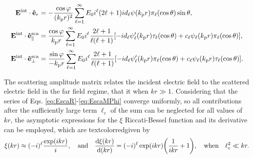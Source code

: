 \begin{subequations}\label{eq:Eint}%
\begin{align}
\vb{E}^\text{int}\cdot\vu{e}_r &=  -\frac{\cos\varphi}{(k_\text{p}r)^2}
               \sum_{\ell = 1}^\infty E_0i^\ell(2\ell+1)
               id_\ell \psi(k_\text{p}r)\pi_\ell(\cos\theta) \sin\theta ,
\label{eq:EintR}\\
\vb{E}^\text{int}\cdot\vu{e}^\text{sca}_\parallel &=  \frac{\cos\varphi}{k_\text{p}r}
               \sum_{\ell = 1}^\infty E_0i^\ell\frac{2\ell+1}{\ell(\ell+1)}
           [-i d_\ell\psi_\ell'(k_\text{p}r)\tau_\ell(\cos\theta)+c_\ell\psi_\ell(k_\text{p}r)\pi_\ell(\cos\theta)],
\label{eq:EintTheta}\\
\vb{E}^\text{int}\cdot\vu{e}^\text{sca}_\perp &=  \frac{\sin\varphi}{-k_\text{p}r}
               \sum_{\ell = 1}^\infty E_0i^\ell\frac{2\ell+1}{\ell(\ell+1)}
           [-i d_\ell\psi_\ell'(k_\text{p}r)\pi_\ell(\cos\theta)+c_\ell\psi_\ell(k_\text{p}r)\tau_\ell(\cos\theta)].
\label{eq:EintMPhi}
\end{align}%
\end{subequations}


The scattering amplitude matrix relates the incident electric field to the scattered electric field in the far field regime, that it when $kr\gg 1$. Considering that the series of Eqs. \eqref{eq:EscaR}-\eqref{eq:EscaMPhi} converge uniformly, so all contributions after the sufficiently large  term $\ell_c$ of the sum can be neglected for all values of $kr$, the asymptotic  expressions for the $\xi$ Riccati-Bessel function and its derivative can be employed, which are textcolor{red}{given by} \cite{bohren_absorption_1983}
%
%
%
\begin{align}
\xi(kr)\approx (-i)^\ell \frac{\exp(ikr)}{i},
\qqtext{and}
\dv{\xi(kr)}{(kr)} = (-i)^\ell \exp(ikr)\qty(\frac{1}{i kr} + 1),
\qqtext{when}
\ell_c^2\ll kr.
\label{eq:RBXiAssym}
\end{align}
%

